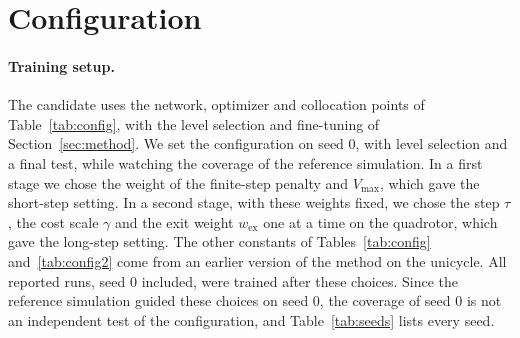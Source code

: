 \section{Configuration}\label{app:config}
\paragraph{Training setup.} The candidate uses the network, optimizer and collocation points of Table~\ref{tab:config}, with the level selection and fine-tuning of Section~\ref{sec:method}. We set the configuration on seed 0, with level selection and a final test, while watching the coverage of the reference simulation. In a first stage we chose the weight of the finite-step penalty and $V_{\max}$, which gave the short-step setting. In a second stage, with these weights fixed, we chose the step $\tau$, the cost scale $\gamma$ and the exit weight $w_{\mathrm{ex}}$ one at a time on the quadrotor, which gave the long-step setting. The other constants of Tables~\ref{tab:config} and~\ref{tab:config2} come from an earlier version of the method on the unicycle. All reported runs, seed 0 included, were trained after these choices. Since the reference simulation guided these choices on seed 0, the coverage of seed 0 is not an independent test of the configuration, and Table~\ref{tab:seeds} lists every seed.





